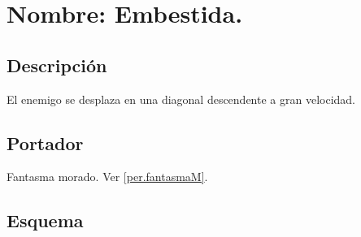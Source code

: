 	\section{Nombre: Embestida.} \label{hab.embestida}
		\subsection{Descripción}
		El enemigo se desplaza en una diagonal descendente a gran velocidad.
		\subsection{Portador}
		Fantasma morado. Ver \ref{per.fantasmaM}.
		\subsection{Esquema}
		